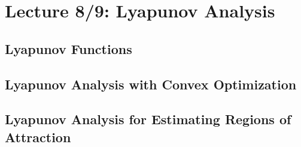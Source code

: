 \chapter{Lecture 8/9: Lyapunov Analysis}
\section{Lyapunov Functions}
\section{Lyapunov Analysis with Convex Optimization}
\section{Lyapunov Analysis for Estimating Regions of Attraction}

